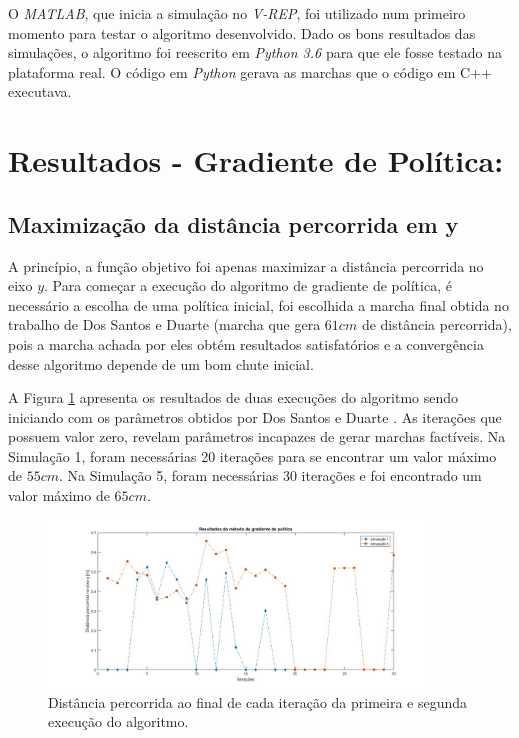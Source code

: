 \documentclass[12pt]{report}
\begin{document}
O \emph{MATLAB}, que inicia a simulação no \emph{V-REP}, foi utilizado num primeiro momento para testar o algoritmo desenvolvido. Dado os bons resultados das simulações, o algoritmo foi reescrito em \emph{Python 3.6} para que ele fosse testado na plataforma real. O código em \emph{Python} gerava as marchas que o código em C++ executava.

\vspace*{-0.6cm}
\chapter*{Resultados - Gradiente de Política:}

\vspace*{-0.75cm}
\section*{Maximização da distância percorrida em y}

A princípio, a função objetivo foi apenas maximizar a distância percorrida no eixo $y$. Para começar a execução do algoritmo de gradiente de política, é necessário a escolha de uma política inicial, foi escolhida a marcha final obtida no trabalho de Dos Santos e Duarte (marcha que gera $61 cm$ de distância percorrida), pois a marcha achada por eles obtém resultados satisfatórios e a convergência desse algoritmo depende de um bom chute inicial.

A Figura \ref{fig:marcha1e5} apresenta os resultados de duas execuções do algoritmo sendo iniciando com os parâmetros obtidos por Dos Santos e Duarte \cite{2}. As iterações que possuem valor zero, revelam parâmetros incapazes de gerar marchas factíveis. Na Simulação 1, foram necessárias 20 iterações para se encontrar um valor máximo de $55 cm$. Na Simulação 5, foram necessárias 30 iterações e foi encontrado um valor máximo de $65 cm$.

\begin{figure}[ht!]
\centering
\includegraphics[width=0.9\textwidth]{imagens/resultados/marcha1e5.jpg}
\caption{Distância percorrida ao final de cada iteração da primeira e segunda execução do algoritmo.}
\label{fig:marcha1e5}
\end{figure}
\end{document}
